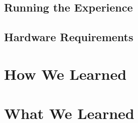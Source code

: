 \documentclass[10pt,journal,compsoc,onecolumn, draftclsnofoot]{IEEEtran}
\begin{document}
\subsection{Running the Experience}
\subsection{Hardware Requirements}

\section{How We Learned}

\section{What We Learned}


% 
% 
\end{document}
